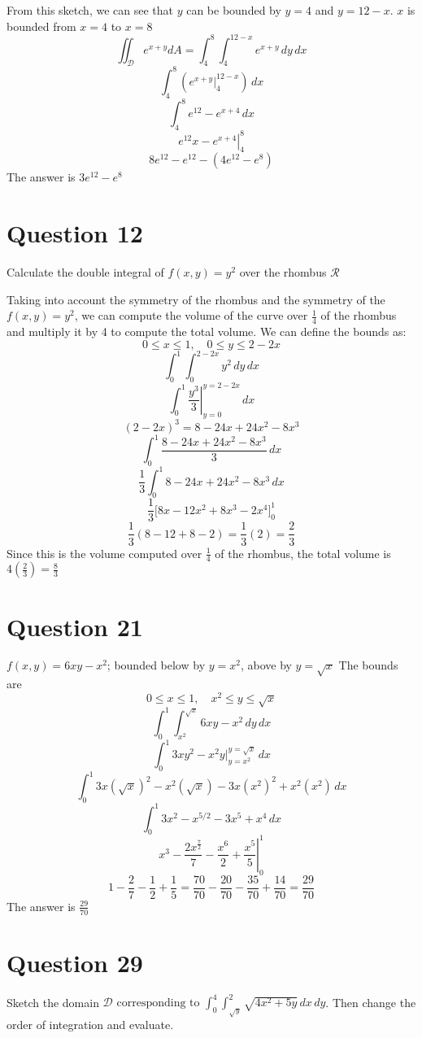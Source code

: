 \documentclass[hidelinks]{article}
\begin{document}
From this sketch, we can see that $y$ can be bounded by $y = 4$ and $y = 12 - x$. $x$ is bounded from $x = 4$ to $x = 8$
\[
    \iint_{\mathcal{D}}e^{x+y}dA = \int_{4}^8 \int_{4}^{12-x} e^{x+y} \, dy \,dx
\]
\[
    \int_{4}^8 \left ( e^{x+y} \Big|_{4}^{12-x}\right ) \,dx
\]
\[
    \int_{4}^8 e^{12} - e^{x+4} \,dx
\]
\[
    \left . e^{12}x - e^{x+4} \right |_{4}^8
\]
\[
    8e^12 - e^12 - (4e^12 -e^8) 
\]
The answer is $3e^{12} - e^8$

\newpage
\section{Question 12}
Calculate the double integral of $f(x,y) = y^2$ over the rhombus $\mathcal{R}$

Taking into account the symmetry of the rhombus and the symmetry of the $f(x,y) = y^2$, we can compute the volume of the curve over $\frac{1}{4}$ of the rhombus and multiply it by 4 to compute the total volume. 
We can define the bounds as: 
\[
    0 \leq x \leq 1, \quad 0 \leq y \leq 2-2x
\]
\[
    \int_{0}^1 \int_{0}^{2-2x} y^2 \, dy \, dx
\]
\[
    \int_{0}^1 \left. \frac{y^3}{3} \right |_{y = 0}^{y = 2-2x} \, dx
\]
\[
    (2-2x)^3 = 8 - 24x + 24x^2 - 8x^3
\]
\[
    \int_{0}^1 \frac{8 - 24x + 24x^2 - 8x^3}{3} \, dx
\]
\[
    \frac{1}{3}\int_{0}^1 8 - 24x + 24x^2 - 8x^3 \, dx
\]
\[
    \frac{1}{3} \Big [8x-12x^2 + 8x^3 - 2x^4 \Big ]_{0}^{1}
\]
\[
    \frac{1}{3} (8-12+8-2) = \frac{1}{3} (2) = \frac{2}{3}
\]
Since this is the volume computed over $\frac{1}{4}$ of the rhombus, the total volume is $4(\frac{2}{3}) = \frac{8}{3}$

\newpage

\section{Question 21}
$f(x,y) = 6xy-x^2$; bounded below by $y =x^2$, above by $y = \sqrt{x}$
The bounds are 
\[
    0 \leq x \leq 1, \quad x^2 \leq y \leq \sqrt{x}
\]
\[
    \int_{0}^1 \int_{x^2}^{\sqrt{x}} 6xy - x^2 \, dy \, dx
\]
\[
    \int_0^1 3xy^2 - x^2y \Big |_{y = x^2}^{y = \sqrt{x}} \, dx
\]
\[
    \int_0^1 3x(\sqrt{x})^2 - x^2(\sqrt{x}) - 3x(x^2)^2 + x^2(x^2) \, dx
\]
\[
    \int_0^1 3x^2 - x^{5/2} - 3x^5 + x^4 \, dx
\]
\[
    \left . x^3 - \frac{2x^{\frac{7}{2}}}{7} - \frac{x^6}{2} + \frac{x^5}{5} \right |_{0}^{1}
\]
\[
    1 - \frac{2}{7} - \frac{1}{2} + \frac{1}{5} = \frac{70}{70} - \frac{20}{70} - \frac{35}{70} + \frac{14}{70} = \frac{29}{70}
\]
The answer is $\frac{29}{70}$
\newpage
\section{Question 29}
Sketch the domain $\mathcal{D} \text{ corresponding to } \int_0^4 \int_{\sqrt{y}}^2 \sqrt{4x^2 + 5y} \, dx \, dy$. Then change the order of integration and evaluate. 
\end{document}
